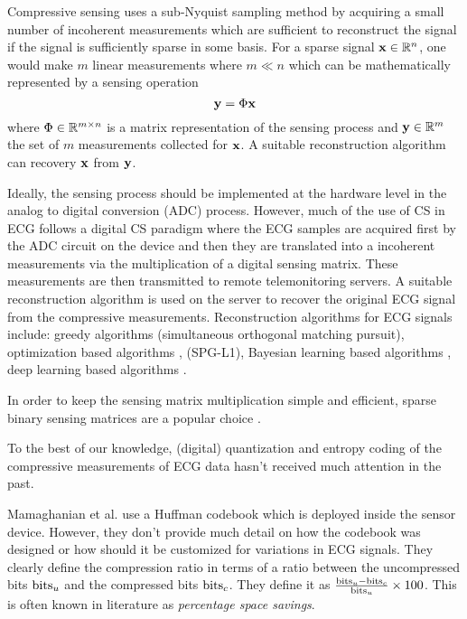 Compressive sensing \cite{donoho2006compressed,baraniuk2007compressive,
candes2006compressive, candes2008introduction, candes2006near}
uses a sub-Nyquist sampling method by acquiring a small number
of incoherent measurements which are sufficient to reconstruct
the signal if the signal is sufficiently sparse in some
basis. For a sparse signal $\mathbf{x} \in \mathbb{R}^n$, one would make
$m$ linear measurements where $m \ll n$ which can be
mathematically represented by a sensing operation
\begin{equation}
\mathbf{y} = \Phi \mathbf{x}
\end{equation}
where $\Phi \in \mathbb{R}^{m \times n}$ is a matrix
representation of the sensing process and $\mathbf{y} \in \mathbb{R}^m$
the set of $m$ measurements collected for $\mathbf{x}$.
A suitable reconstruction algorithm can recovery $\mathbf{x}$
from $\mathbf{y}$.

Ideally, the sensing process should be implemented at the
hardware level in the analog to digital conversion (ADC) process.
However, much of the use of CS in ECG follows
a digital CS paradigm \cite{mamaghanian2011compressed} where
the ECG samples are acquired first by the ADC circuit on the
device and then they are translated into a incoherent
measurements via the multiplication of a digital sensing matrix.
These measurements are then transmitted
to remote telemonitoring servers. A suitable reconstruction
algorithm is used on the server to recover the original
ECG signal from the compressive measurements.
Reconstruction algorithms for ECG signals include:
greedy algorithms 
\cite{polania2011compressed} (simultaneous orthogonal matching pursuit),
optimization based algorithms \cite{zhang2014energy},
\cite{mamaghanian2011compressed} (SPG-L1),
Bayesian learning based algorithms
\cite{zhang2012compressed,zhang2014spatiotemporal,zhang2013extension},
deep learning based algorithms \cite{zhang2021csnet}.

In order to keep the sensing matrix multiplication
simple and efficient, sparse binary sensing matrices
are a popular choice \cite{mamaghanian2011compressed,zhang2012compressed}.

To the best of our knowledge, (digital) quantization and entropy coding of
the compressive measurements of ECG data hasn't received
much attention in the past.

Mamaghanian et al.\cite{mamaghanian2011compressed} use a Huffman codebook
which is deployed inside the sensor device.
However, they don't
provide much detail on how the codebook was designed or how should
it be customized for variations in ECG signals.
They clearly define the compression ratio in terms
of a ratio between the uncompressed bits $\mathrm{bits}_u$
and the compressed bits $\mathrm{bits}_c$. They define it
as $\frac{\mathrm{bits}_u - \mathrm{bits}_c}{\mathrm{bits}_u} \times 100$.
This is often known in literature as
\emph{percentage space savings}.

